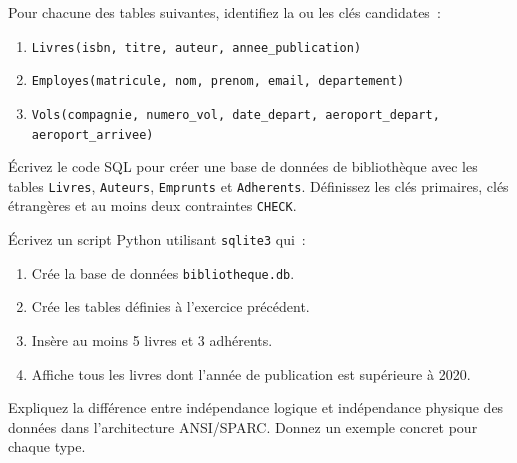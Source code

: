 \begin{exercice}
Pour chacune des tables suivantes, identifiez la ou les cl\'es candidates~:
\begin{enumerate}
    \item \texttt{Livres(isbn, titre, auteur, annee\_publication)}
    \item \texttt{Employes(matricule, nom, prenom, email, departement)}
    \item \texttt{Vols(compagnie, numero\_vol, date\_depart, aeroport\_depart, aeroport\_arrivee)}
\end{enumerate}
\end{exercice}

\begin{exercice}
\'Ecrivez le code SQL pour cr\'eer une base de donn\'ees de biblioth\`eque avec
les tables \texttt{Livres}, \texttt{Auteurs}, \texttt{Emprunts} et
\texttt{Adherents}. D\'efinissez les cl\'es primaires, cl\'es \'etrang\`eres
et au moins deux contraintes \texttt{CHECK}.
\end{exercice}

\begin{exercice}
\'Ecrivez un script Python utilisant \texttt{sqlite3} qui~:
\begin{enumerate}
    \item Cr\'ee la base de donn\'ees \texttt{bibliotheque.db}.
    \item Cr\'ee les tables d\'efinies \`a l'exercice pr\'ec\'edent.
    \item Ins\`ere au moins 5 livres et 3 adh\'erents.
    \item Affiche tous les livres dont l'ann\'ee de publication est sup\'erieure \`a 2020.
\end{enumerate}
\end{exercice}

\begin{exercice}
Expliquez la diff\'erence entre ind\'ependance logique et ind\'ependance physique
des donn\'ees dans l'architecture ANSI/SPARC. Donnez un exemple concret pour chaque type.
\end{exercice}
